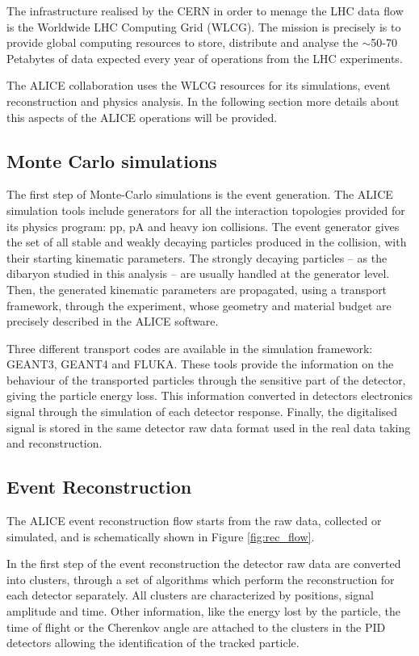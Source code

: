 The infrastructure realised by the CERN in order to menage the LHC data flow is the Worldwide 
LHC Computing Grid (WLCG). The mission is precisely is to provide global 
computing resources to store, distribute and analyse the $\sim$50-70 Petabytes of data expected every
year of operations from the LHC experiments.

The ALICE collaboration uses the WLCG resources for its simulations, event reconstruction and physics
analysis. In the following section more details about this aspects of the ALICE operations will be 
provided.

%
\subsection{Monte Carlo simulations} \label{sec:montecarlo}

The first step of Monte-Carlo simulations is the event generation. 
The ALICE simulation tools include generators for all the interaction topologies provided for its
physics program: pp, pA and heavy ion collisions.
The event generator gives the set of all stable and weakly decaying particles produced in the collision,
with their starting kinematic parameters. The strongly decaying particles -- as the \dst dibaryon studied
in this analysis -- are usually handled at the generator level.
Then, the generated kinematic parameters are propagated, using a transport framework, through the
experiment, whose geometry and material budget are precisely described in the ALICE software.

Three different transport codes are available in the simulation framework: GEANT3, GEANT4 and FLUKA.
These tools provide the information on the behaviour of the transported particles through the sensitive
part of the detector, giving the particle energy loss. 
This information converted in detectors electronics signal through the simulation of each detector
response. Finally, the digitalised signal is stored in the same detector raw data format used in the 
real data taking and reconstruction.

%
\subsection{Event Reconstruction} \label{sec:event_rec}

The ALICE event reconstruction flow starts from the raw data, collected or simulated, and is 
schematically shown in Figure \ref{fig:rec_flow}. 

In the first step of the event reconstruction the detector raw data are converted into clusters, 
through a set of algorithms which perform the reconstruction for each detector separately.
All clusters are characterized by positions, signal amplitude and time.
Other information, like the energy lost by the particle, the time of flight or the Cherenkov 
angle are attached to the clusters in the PID detectors allowing the identification of the 
tracked particle.

